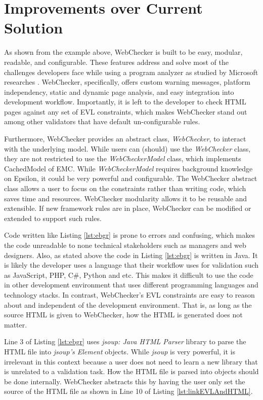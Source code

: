 \documentclass[conference]{IEEETran}
\begin{document}
\section{Improvements over Current Solution}
As shown from the example above, WebChecker is built to be easy, modular, readable, and configurable. These features address and solve most of the challenges developers face while using a program analyzer as studied by Microsoft researches \cite{christakis16}. WebChecker, specifically, offers custom warning messages, platform independency, static and dynamic page analysis, and easy integration into development workflow. Importantly, it is left to the developer to check HTML pages against any set of EVL constraints, which makes WebChecker stand out among other validators that have default un-configurable rules.    

Furthermore, WebChecker provides an abstract class, \textit{WebChecker},  to interact with the underlying model. While users can (should) use the \textit{WebChecker} class, they are not restricted to use the \textit{WebCheckerModel} class, which implements CachedModel of EMC. While \textit{WebCheckerModel} requires background knowledge on Epsilon, it could be very powerful and configurable. The WebChecker abstract class allows a user to focus on the constraints rather than writing code, which saves time and resources. WebChecker modularity allows it to be reusable and extensible. If new framework rules are in place, WebChecker can be modified or extended to support such rules. 

Code written like Listing \ref{lst:ebgr} is prone to errors and confusing, which makes the code unreadable to none technical stakeholders such as managers and web designers. Also, as stated above the code in Listing  \ref{lst:ebgr}  is written in Java. It is likely the developer uses a language that their workflow uses for validation such as JavaScript, PHP, C\#, Python and etc. This makes it difficult to use the code in other development environment that uses different programming languages and technology stacks. In contrast, WebChecker's EVL constraints are easy to reason about and independent of the development environment. That is, as long as the source HTML is given to WebChecker, how the HTML is generated does not matter. 

Line 3 of Listing \ref{lst:ebgr} uses \textit{jsoup: Java HTML Parser}\cite{jsoup} library to parse the HTML file into \textit{jsoup's Element} objects. While \textit{jsoup} is very powerful, it is irrelevant in this context because a user does not need to learn a new library that is unrelated to a validation task. How the HTML file is parsed into objects should be done internally. WebChecker abstracts this by having the user only set the source of the HTML file as shown in Line 10 of Listing \ref{lst:linkEVLAndHTML}.           
\end{document}
